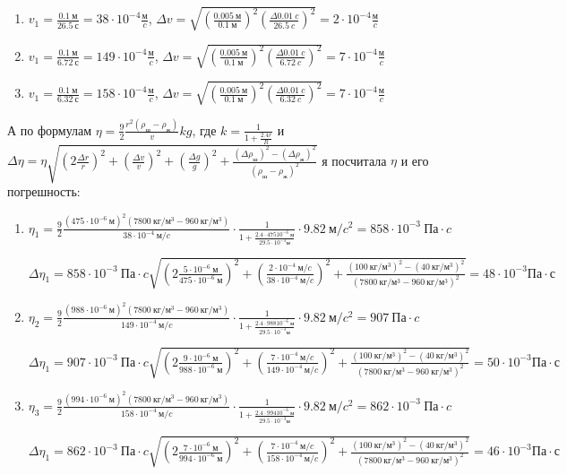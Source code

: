 \documentclass[a4paper]{article}
\begin{document}
\begin{enumerate}
    \item $v_1 = \frac{0.1 \ м}{26.5 \ с} = 38 \cdot 10^{-4} \frac{м}{c}$, $\Delta v = \sqrt{(\frac{0.005 \ м}{0.1 \ м})^2 (\frac{\Delta 0.01 \ c}{26.5 \ c})^2} = 2 \cdot 10^{-4} \frac{м}{c}$
    \item $v_1 = \frac{0.1 \ м}{6.72 \ с} = 149 \cdot 10^{-4} \frac{м}{c}$, $\Delta v =\sqrt{(\frac{0.005 \ м}{0.1 \ м})^2 (\frac{\Delta 0.01 \ c}{6.72 \ c})^2} = 7 \cdot 10^{-4} \frac{м}{c}$
    \item $v_1 = \frac{0.1 \ м}{6.32 \ с} = 158 \cdot 10^{-4} \frac{м}{c}$, $\Delta v =\sqrt{(\frac{0.005 \ м}{0.1 \ м})^2 (\frac{\Delta 0.01 \ c}{6.32 \ c})^2} = 7 \cdot 10^{-4} \frac{м}{c}$
\end{enumerate}

А по формулам $\eta = \frac{9}{2}\frac{r^2(\rho_ш - \rho_ж)}{v} k g$, где $k = \frac{1}{1 + \frac{2.4 r}{R}}$ и $\Delta \eta =  \eta \sqrt{(2\frac{\Delta r}{r})^2 + (\frac{\Delta v}{v})^2 + (\frac{\Delta g}{g})^2 + \frac{(\Delta \rho_ш)^2 - (\Delta \rho_ж)^2}{(\rho_ш - \rho_ж)^2}}$ я посчитала $\eta$ и его погрешность:

\begin{enumerate}
    \item $\eta_1 = \frac{9}{2}\frac{(475 \cdot 10^{-6} \ м)^2(7800 \ кг/м^3 - 960 \ кг/м^3)}{38  \cdot 10^{-4} \ м/c}\cdot \frac{1}{1 + \frac{2.4 \cdot 475 \dot 10^{-6} \ м}{29.5 \cdot 10^{-3} м}} \cdot 9.82 \ м/c^2 = 858  \cdot 10^{-3} \ Па \cdot c$
    
    $\Delta \eta_1 = 858  \cdot 10^{-3}  \ Па \cdot c \sqrt{(2\frac{5 \cdot 10^{-6} \ м}{475 \cdot 10^{-6} \ м})^2 + (\frac{2 \cdot 10^{-4} \ м/c}{38 \cdot 10^{-4} \ м/c})^2 + \frac{(100 \ кг/м^3)^2 - (40 \ кг/м^3)^2}{(7800 \ кг/м^3 - 960 \ кг/м^3)^2}} = 48 \cdot 10^{-3} Па \cdot с$
    
    \item $\eta_2 = \frac{9}{2}\frac{(988 \cdot 10^{-6} \ м)^2(7800 \ кг/м^3 - 960 \ кг/м^3)}{149  \cdot 10^{-4} \ м/c}\cdot \frac{1}{1 + \frac{2.4 \cdot 988 \dot 10^{-6} \ м}{29.5 \cdot 10^{-3} м}} \cdot 9.82 \ м/c^2 = 907 \ Па \cdot c$
    
    $\Delta \eta_1 = 907  \cdot 10^{-3}  \ Па \cdot c \sqrt{(2\frac{9 \cdot10^{-6} \ м}{988  \cdot 10^{-6} \ м})^2 + (\frac{7 \cdot 10^{-4} \ м/c}{149 \cdot 10^{-4} \ м/c})^2 + \frac{(100 \ кг/м^3)^2 - (40 \ кг/м^3)^2}{(7800 \ кг/м^3 - 960 \ кг/м^3)^2}} = 50 \cdot 10^{-3} Па \cdot с$
    
    \item $\eta_3 = \frac{9}{2}\frac{(994 \cdot 10^{-6} \ м)^2(7800 \ кг/м^3 - 960 \ кг/м^3)}{158  \cdot 10^{-4} \ м/c}\cdot \frac{1}{1 + \frac{2.4 \cdot 994 \dot 10^{-6} \ м}{29.5 \cdot 10^{-3} м}} \cdot 9.82 \ м/c^2 = 862  \cdot 10^{-3} \ Па \cdot c$
    
    $\Delta \eta_1 = 862  \cdot 10^{-3}  \ Па \cdot c \sqrt{(2\frac{7 \cdot 10^{-6} \ м}{994 \cdot 10^{-6} \ м})^2 + (\frac{7 \cdot 10^{-4} \ м/c}{158 \cdot 10^{-4} \ м/c})^2 + \frac{(100 \ кг/м^3)^2 - (40 \ кг/м^3)^2}{(7800 \ кг/м^3 - 960 \ кг/м^3)^2}} = 46 \cdot 10^{-3} Па \cdot с$
\end{enumerate}
\end{document}
